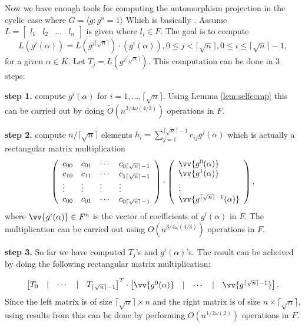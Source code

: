 \documentclass[sigconf]{acmart}
\newcommand{\osumcost}{O(n^{3/4 \omega(4/3)})}
\newcommand{\osumcosttilde}{\tilde{O}(n^{3/4 \omega(4/3)})}
\theoremstyle{acmplain}
\begin{document}
Now we have enough tools for computing the automorphism projection in the cyclic case where $G = \langle g: g^n =1 \rangle$
Which is basically \cite[Algorithm AP]{Kaltofen}. 
Assume $L = \begin{bmatrix}
l_1 & l_2 & \ldots & l_n
\end{bmatrix}$ is given where $l_i \in F$. The goal is to compute 
\begin{equation}\label{eq:autproj}
L(g^i(\alpha)) = L(g^{j \lceil \sqrt{n} \rceil})\cdot (g^i(\alpha)), 0 \leq j < \lceil \sqrt{n} \rceil, 0 \leq i \leq \lceil \sqrt{n} \rceil -1, 
\end{equation}
for a given $\alpha \in K$. Let $T_j = L(g^{j \lceil \sqrt{n} \rceil})$. This computation can be done in 3 steps:

\textbf{step 1.} compute $g^i(\alpha)$ for $i = 1, \ldots , \lceil \sqrt{n} \rceil$. Using Lemma \ref{lem:selfcomp} this 
can be carried out by doing $\osumcosttilde$ operations in $F$.

\textbf{step 2.} compute $n/\lceil \sqrt{n} \rceil$ elements $h_i = \sum_{j = 1}^ {\lceil \sqrt{n} \rceil-1}c_{ij}g^{j}(\alpha)$ which is actually a rectangular matrix multiplication 
\begin{equation}
\left(\begin{array}{llll}
c_{00} & c_{01} & \cdots & c_{0\lceil \sqrt{n} \rceil -1}\\
c_{10} & c_{11} & \cdots & c_{1\lceil \sqrt{n} \rceil -1}\\
\vdots & \vdots & \vdots & \vdots \\
c_{00} & c_{01} & \cdots & c_{0\lceil \sqrt{n} \rceil -1}\\
\end{array}\right)\cdot 
\left(\begin{array}{l}
\vv{g^0(\alpha)}\\
\vv{g^1(\alpha)}\\
\vdots\\
\vv{g^{\lceil \sqrt{n} \rceil -1}(\alpha)}
\end{array}\right),
\end{equation}
where $\vv{g^i(\alpha)} \in F^n$ is the vector of coefficients of $g^i(\alpha)$ in $F$. The multiplication can be 
carried out using $\osumcost$ operations in $F$.

\textbf{step 3.} So far we have computed $T_j$'s and $g^i(\alpha)$'s. The result can be acheived by doing the following 
rectangular matrix multiplication:

$$
\begin{bmatrix}
T_0 & \vert & \cdots & \vert &T_{\lceil \sqrt{n} \rceil -1}
\end{bmatrix}^T \cdot
\begin{bmatrix}
\vv{g^0(\alpha)} & \vert & \cdots & \vert & \vv{g^{\lceil \sqrt{n} \rceil -1}}
\end{bmatrix}.
$$
Since the left matrix is of size $\lceil \sqrt{n} \rceil \times n$ and the right matrix is of size $n \times \lceil \sqrt{n} \rceil$,
using results from \cite{LeGall} this can be done by performing $O(n^{1/2\omega(2)})$ operations in $F$.
\end{document}
